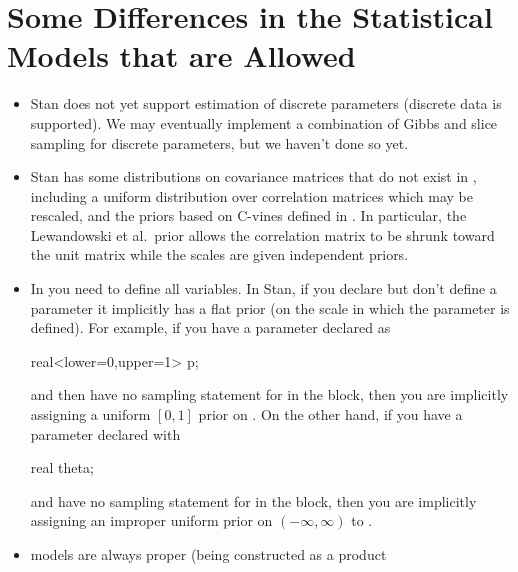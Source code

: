 \section{Some Differences in the Statistical Models that are Allowed}

\begin{itemize}
\item Stan does not yet support estimation of discrete parameters
  (discrete data is supported).  We may eventually implement a
  combination of Gibbs and slice sampling for discrete parameters, but
  we haven't done so yet.
\item Stan has some distributions on covariance matrices that do not
  exist in \BUGS, including a uniform distribution over correlation
  matrices which may be rescaled, and the priors based on C-vines
  defined in \citep{LewandowskiKurowickaJoe:2009}.  In particular, the
  Lewandowski et al.\ prior allows the correlation matrix to be shrunk
  toward the unit matrix while the scales are given independent priors.
\item In \BUGS you need to define all variables.  In Stan, if you
  declare but don't define a parameter it implicitly has a flat prior
  (on the scale in which the parameter is defined).  For example, if
  you have a parameter  declared as
\begin{stancode}
real<lower=0,upper=1> p;
\end{stancode}
%
and then have no sampling statement for  in the 
block, then you are implicitly assigning a uniform $[0,1]$ prior on
.
On the other hand, if you have a parameter  declared with
%
\begin{stancode}
real theta;
\end{stancode}
%
and have no sampling statement for  in the
 block,
 then you are implicitly assigning an improper uniform prior
on $(-\infty,\infty)$ to .
%
\item \BUGS models are always proper (being constructed as a product

\end{itemize}
